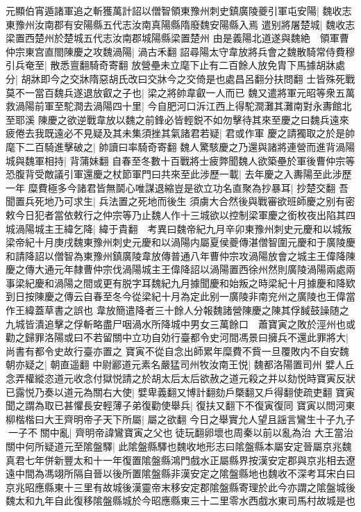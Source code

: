 元顯伯宵遁諸軍追之斬獲萬計詔以僧智領東豫州刺史鎮廣陵夔引軍屯安陽|{
	魏收志東豫州汝南郡有安陽縣五代志汝南真陽縣隋廢魏安陽縣入焉}
遣别將屠楚城|{
	魏收志梁置西楚州於楚城五代志汝南郡城陽縣梁置楚州}
由是義陽北道遂與魏絶　領軍曹仲宗東宫直閤陳慶之攻魏渦陽|{
	渦古禾翻}
詔尋陽太守韋放將兵會之魏散騎常侍費穆引兵奄至|{
	散悉亶翻騎奇寄翻}
放營壘未立麾下止有二百餘人放免胄下馬據胡牀處分|{
	胡牀即今之交牀隋惡胡氏改曰交牀今之交倚是也處昌呂翻分扶問翻}
士皆殊死戰莫不一當百魏兵遂退放叡之子也|{
	梁之將帥韋叡一人而已}
魏又遣將軍元昭等衆五萬救渦陽前軍至駝澗去渦陽四十里|{
	今自肥河口泝江西上得駝澗灘其灘南對永夀館北至耶溪}
陳慶之欲逆戰韋放以魏之前鋒必皆輕鋭不如勿擊待其來至慶之曰魏兵遠來疲倦去我既遠必不見疑及其未集須挫其氣諸君若疑|{
	君或作軍}
慶之請獨取之於是帥麾下二百騎進擊破之|{
	帥讀曰率騎奇寄翻}
魏人驚駭慶之乃還與諸將連營而進背渦陽城與魏軍相持|{
	背蒲妹翻}
自春至冬數十百戰將士疲弊聞魏人欲築壘於軍後曹仲宗等恐腹背受敵議引軍還慶之杖節軍門曰共來至此涉歷一載|{
	去年慶之入夀陽至此涉歷一年}
糜費極多今諸君皆無鬬心唯謀退縮豈是欲立功名直聚為抄暴耳|{
	抄楚交翻}
吾聞置兵死地乃可求生|{
	兵法置之死地而後生}
須虜大合然後與戰審欲班師慶之别有密敕今日犯者當依敕行之仲宗等乃止魏人作十三城欲以控制梁軍慶之銜枚夜出陷其四城渦陽城主王緯乞降|{
	緯于貴翻　考異曰魏帝紀九月辛卯東豫州刺史元慶和以城叛梁帝紀十月庚戌魏東豫州刺史元慶和以渦陽内屬夏侯夔傳湛僧智圍元慶和于廣陵慶和請降詔以僧智為東豫州鎮廣陵韋放傳普通八年曹仲宗攻渦陽放會之城主王偉降陳慶之傳大通元年隸曹仲宗伐渦陽城主王偉降詔以渦陽置西徐州然則廣陵渦陽兩處兩事梁紀慶和渦陽之間或更有脱字耳魏紀九月據聞慶和始叛之時梁紀十月據慶和降欵到日按陳慶之傳云自春至冬今從梁紀十月為定此别一廣陵非南兖州之廣陵也王偉當作王緯蓋草書之誤也}
韋放簡遣降者三十餘人分報魏諸營陳慶之陳其俘馘鼓譟随之九城皆潰追擊之俘斬略盡尸咽渦水所降城中男女三萬餘口　蕭寶寅之敗於涇州也或勸之歸罪洛陽或曰不若留關中立功自効行臺都令史河間馮景曰擁兵不還此罪將大|{
	尚書有都令史故行臺亦置之}
寶寅不從自念出師累年糜費不貲一旦覆敗内不自安魏朝亦疑之|{
	朝直遥翻}
中尉酈道元素名嚴猛司州牧汝南王悦|{
	魏都洛陽置司州}
嬖人丘念弄權縱恣道元收念付獄悦請之於胡太后太后欲赦之道元殺之并以劾悦時寶寅反狀已露悦乃奏以道元為關右大使|{
	嬖卑義翻又博計翻劾戶槩翻又戶得翻使疏吏翻}
寶寅聞之謂為取已甚懼長安輕薄子弟復勸使舉兵|{
	復扶又翻下不復寅復同}
寶寅以問河東柳楷楷曰大王齊明帝子天下所屬|{
	屬之欲翻}
今日之舉實允人望且謡言鸞生十子九子一子不關中亂|{
	齊明帝諱鸞寶寅之父也徒玩翻卵壞也周秦以前以亂為治}
大王當治關中何所疑道元至隂盤驛|{
	此隂盤縣驛也魏收地形志曰隂盤縣本屬安定晉屬京兆魏真君七年併新豐太和十一年復置隂盤縣鴻門戲水正屬縣界按漢安定郡與京兆相去遼遠中間為馮翊所隔自晉以後所置隂盤縣非漢安定之隂盤縣地也魏收不深考耳宋白曰京兆昭應縣東十三里有故城後漢靈帝末移安定郡隂盤縣寄理於此今亦謂之隂盤城後魏太和九年自此復移隂盤縣城於今昭應縣東三十二里零水西戲水東司馬村故城是也}
